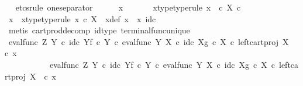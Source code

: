 \begin{isabellebody}
\ \ \isamarkupfalse%
{\isacharparenleft}{\kern0pt}etcs{\isacharunderscore}{\kern0pt}rule\ one{\isacharunderscore}{\kern0pt}separator{\isacharparenright}{\kern0pt}\isanewline
\ \ \ \ \isamarkupfalse%
\ x{}\ \isanewline
\ \ \ \ \isamarkupfalse%
\ x{}{\isacharunderscore}{\kern0pt}type{\isacharbrackleft}{\kern0pt}type{\isacharunderscore}{\kern0pt}rule{\isacharbrackright}{\kern0pt}{\isacharcolon}{\kern0pt}\ {\isachardoublequoteopen}x{}\ \ {\isasymin}\isactrlsub c\ X\ {\isasymtimes}\isactrlsub c\ {\isasymone}{\isachardoublequoteclose}\isanewline
\ \ \ \ \isamarkupfalse%
\ \isamarkupfalse%
\ x\ \ x{\isacharunderscore}{\kern0pt}type{\isacharbrackleft}{\kern0pt}type{\isacharunderscore}{\kern0pt}rule{\isacharbrackright}{\kern0pt}{\isacharcolon}{\kern0pt}\ {\isachardoublequoteopen}x\ {\isasymin}\isactrlsub c\ X{\isachardoublequoteclose}\ \ x{\isacharunderscore}{\kern0pt}def{\isacharcolon}{\kern0pt}\ {\isachardoublequoteopen}x{}\ {\isacharequal}{\kern0pt}\ {\isasymlangle}x{\isacharcomma}{\kern0pt}\ id\isactrlsub c\ {\isasymone}{\isasymrangle}{\isachardoublequoteclose}\isanewline
\ \ \ \ \ \ \isamarkupfalse%
\ {\isacharparenleft}{\kern0pt}metis\ cart{\isacharunderscore}{\kern0pt}prod{\isacharunderscore}{\kern0pt}decomp\ id{\isacharunderscore}{\kern0pt}type\ terminal{\isacharunderscore}{\kern0pt}func{\isacharunderscore}{\kern0pt}unique{\isacharparenright}{\kern0pt}\isanewline
\ \ \ \ \isamarkupfalse%
\ {\isachardoublequoteopen}{\isacharparenleft}{\kern0pt}{\isacharparenleft}{\kern0pt}{\isacharparenleft}{\kern0pt}eval{\isacharunderscore}{\kern0pt}func\ Z\ Y\ {\isasymcirc}\isactrlsub c\ {\isasymlangle}id\isactrlsub c\ Y{\isacharcomma}{\kern0pt}f\ {\isasymcirc}\isactrlsub c\ {\isasymbeta}\isactrlbsub Y\isactrlesub {\isasymrangle}{\isacharparenright}{\kern0pt}\ {\isasymcirc}\isactrlsub c\ eval{\isacharunderscore}{\kern0pt}func\ Y\ X\ {\isasymcirc}\isactrlsub c\ {\isasymlangle}id\isactrlsub c\ X{\isacharcomma}{\kern0pt}g\ {\isasymcirc}\isactrlsub c\ {\isasymbeta}\isactrlbsub X\isactrlesub {\isasymrangle}{\isacharparenright}{\kern0pt}\ {\isasymcirc}\isactrlsub c\ left{\isacharunderscore}{\kern0pt}cart{\isacharunderscore}{\kern0pt}proj\ X\ {\isasymone}{\isacharparenright}{\kern0pt}\ {\isasymcirc}\isactrlsub c\ x{}\ {\isacharequal}{\kern0pt}\ \isanewline
\ \ \ \ \ \ \ \ \ \ \ {\isacharparenleft}{\kern0pt}{\isacharparenleft}{\kern0pt}eval{\isacharunderscore}{\kern0pt}func\ Z\ Y\ {\isasymcirc}\isactrlsub c\ {\isasymlangle}id\isactrlsub c\ Y{\isacharcomma}{\kern0pt}f\ {\isasymcirc}\isactrlsub c\ {\isasymbeta}\isactrlbsub Y\isactrlesub {\isasymrangle}{\isacharparenright}{\kern0pt}\ {\isasymcirc}\isactrlsub c\ eval{\isacharunderscore}{\kern0pt}func\ Y\ X\ {\isasymcirc}\isactrlsub c\ {\isasymlangle}id\isactrlsub c\ X{\isacharcomma}{\kern0pt}g\ {\isasymcirc}\isactrlsub c\ {\isasymbeta}\isactrlbsub X\isactrlesub {\isasymrangle}{\isacharparenright}{\kern0pt}\ {\isasymcirc}\isactrlsub c\ left{\isacharunderscore}{\kern0pt}cart{\isacharunderscore}{\kern0pt}proj\ X\ {\isasymone}\ {\isasymcirc}\isactrlsub c\ x{}{\isachardoublequoteclose}\isanewline

\end{isabellebody}

